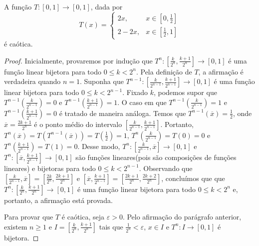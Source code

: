 
\begin{lemma}
\label{lema conjugacaotopologica 1}
A função $T: [0,1] \to [0,1]$, dada por
\[
T(x) = 
  \begin{cases}
      2x, & x \in \left[0, \frac{1}{2}\right] \\
      2 - 2x, & x \in \left[\frac{1}{2}, 1\right] 
  \end{cases}
\]
é caótica.
\end{lemma}

\begin{proof}
Inicialmente, provaremos por indução que $T^n: \left[\frac{k}{2^n}, \frac{k+1}{2^n}\right] \to [0,1]$ é uma função linear bijetora para todo $0 \leq k  < 2^n$. Pela definição de $T$, a afirmação é verdadeira quando $n = 1$. Suponha que $T^{n-1}: \left[\frac{k}{2^{n-1}}, \frac{k+1}{2^{n-1}}\right] \to [0,1]$ é uma função linear bijetora para todo $0 \leq k < 2^{n-1}$. Fixado $k$, podemos supor que $T^{n-1}\left(\frac{k}{2^{n-1}}\right) = 0$ e $T^{n-1}\left(\frac{k+1}{2^{n-1}}\right) = 1$. O caso em que $T^{n-1}\left(\frac{k}{2^{n-1}}\right) = 1$ e $T^{n-1}\left(\frac{k+1}{2^{n-1}}\right) = 0$ é tratado de maneira análoga. Temos que $T^{n-1}(\overline{x}) = \frac{1}{2}$, onde $\overline{x} = \frac{2k+1}{2^n}$ é o ponto médio do intervalo $\left[\frac{k}{2^{n-1}}, \frac{k+1}{2^{n-1}}\right]$. Portanto, $T^n(\overline{x}) = T(T^{n-1}(\overline{x})) = T\left(\frac{1}{2}\right) = 1$, $T^n\left(\frac{k}{2^{n-1}}\right) = T(0) = 0$ e $T^n\left(\frac{k+1}{2^{n-1}}\right) = T(1) = 0$. Desse modo, $T^n: \left[\frac{k}{2^{n-1}}, \overline{x}\right] \to [0,1]$ e $T^n: \left[\overline{x}, \frac{k+1}{2^{n-1}}\right] \to [0,1]$ são funções lineares(pois são composições de funções lineares) e bijetoras para todo $0 \leq k < 2^{n-1}$. Observando que $\left[\frac{k}{2^{n-1}}, \overline{x}\right] =  \left[\frac{2k}{2^n}, \frac{2k+1}{2^n}\right]$ e $\left[\overline{x}, \frac{k+1}{2^{n-1}}\right] =  \left[\frac{2k+1}{2^n}, \frac{2k+2}{2^n}\right]$, concluímos que  que $T^n: \left[\frac{k}{2^n}, \frac{k+1}{2^n}\right] \to [0,1]$ é uma função linear bijetora para todo $0 \leq k  < 2^n$ e, portanto, a afirmação está provada.

Para provar que $T$ é caótica, seja $\varepsilon > 0$. Pelo afirmação do parágrafo anterior, existem $n \geq 1$ e $I = \left[\frac{k}{2^n}, \frac{k+1}{2^n}\right]$  tais que $\frac{1}{2^n} < \varepsilon$, $x \in I$ e $T^n: I \to [0,1]$ é bijetora.


\end{proof}
